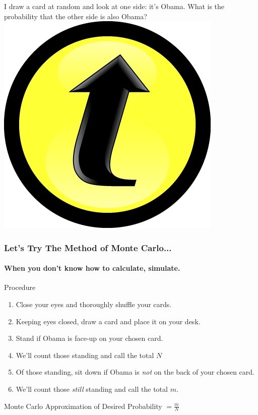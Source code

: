 \documentclass[handout]{beamer}
\begin{document}
\begin{frame}
\begin{alertblock}{I draw a card at random and look at one side: it's Obama. What is the probability that the other side is also Obama?\\\hfill\includegraphics[scale = 0.05]{./images/clicker} }\end{alertblock}
\end{frame}
\begin{frame}
\frametitle{Let's Try The Method of Monte Carlo...}
\framesubtitle{When you don't know how to calculate, simulate.}
Procedure
\begin{enumerate}\pause
\item Close your eyes and thoroughly shuffle your cards.\pause
\item Keeping eyes closed, draw a card and place it on your desk.\pause
\item Stand if Obama is face-up on your chosen card. \pause
\item We'll count those standing and call the total $N$\pause
\item Of those standing, sit down if Obama is \emph{not} on the back of your chosen card.\pause
\item We'll count those \emph{still} standing and call the total $m$.\pause
\end{enumerate}

\begin{alertblock}{Monte Carlo Approximation of Desired Probability $\displaystyle= \frac{m}{N}$}\end{alertblock}
\end{frame}
\end{document}
